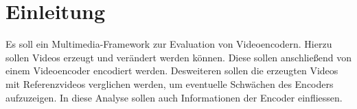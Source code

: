 \section{Einleitung}

Es soll ein Multimedia-Framework zur Evaluation von Videoencodern. Hierzu sollen Videos erzeugt und verändert werden können. Diese sollen anschließend von einem Videoencoder encodiert werden. Desweiteren sollen die erzeugten Videos mit Referenzvideos verglichen werden, um eventuelle Schwächen des Encoders aufzuzeigen. In diese Analyse sollen auch Informationen der Encoder einfliessen.
